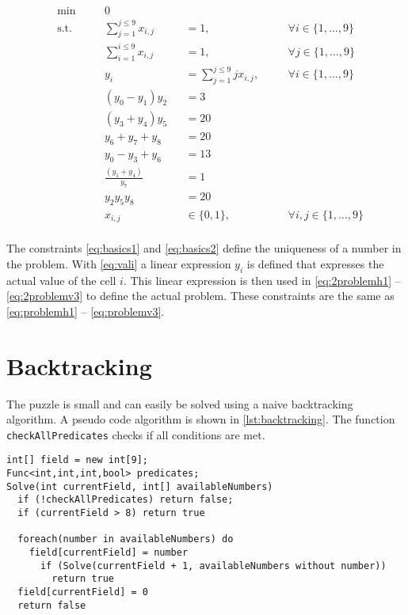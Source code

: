\documentclass[parskip=half]{scrartcl}
\newcommand{\onetonine}{\{1,\ldots,9\}}
\begin{document}
\begin{align}
&\min \quad &&0 \\
& \text{s.t.} \quad 
&& \sum_{j=1}^{j\leq 9}x_{i,j}   &&= 1 		,&&\quad \forall i \in \onetonine \label{eq:basics1} \\
& && \sum_{i=1}^{i\leq 9}x_{i,j} 			&&=1  		,&&\quad \forall j \in \onetonine \label{eq:basics2} \\
& && y_i &&= \sum_{j=1}^{j\leq 9} jx_{i,j}  ,&&\quad \forall i \in \onetonine \label{eq:vali} \\
& && (y_0 - y_1) y_2  &&= 3 \label{eq:2problemh1} \\
& && (y_3 + y_4) y_5  &&= 20 \label{eq:2problemh2} \\
& && y_6  + y_7 + y_8 &&= 20 \label{eq:2problemh3} \\
& && y_0 - y_3 + y_6  &&= 13 \label{eq:2problemv1} \\
& && \frac{(y_1 + y_4)}{y_7} &&= 1 \label{eq:2problemv2} \\
& && y_2  y_5  y_8 &&= 20 \label{eq:2problemv3} \\
& && x_{i,j} 		&&\in \{0,1\} ,&& \quad \forall i,j \in \onetonine \\
\end{align}

The constraints \autoref{eq:basics1} and \autoref{eq:basics2} define the uniqueness of a number in the problem. With \autoref{eq:vali} a linear expression $y_i$ is defined that expresses the actual value of the cell $i$. This linear expression is then used in \autoref{eq:2problemh1} -- \autoref{eq:2problemv3} to define the actual problem. These constraints are the same as \autoref{eq:problemh1} -- \autoref{eq:problemv3}.

\clearpage
\section{Backtracking}
The puzzle is small and can easily be solved using a naive backtracking algorithm.
A pseudo code algorithm is shown in \autoref{lst:backtracking}. The function \lstinline|checkAllPredicates| checks if all conditions are met.
\begin{lstlisting}[label=lst:backtracking, caption=Backtrack algorithm]
int[] field = new int[9];
Func<int,int,int,bool> predicates;
Solve(int currentField, int[] availableNumbers) 
  if (!checkAllPredicates) return false;
  if (currentField > 8) return true
	
  foreach(number in availableNumbers) do
    field[currentField] = number
      if (Solve(currentField + 1, availableNumbers without number)) 
        return true	
  field[currentField] = 0
  return false
\end{lstlisting}
\end{document}
